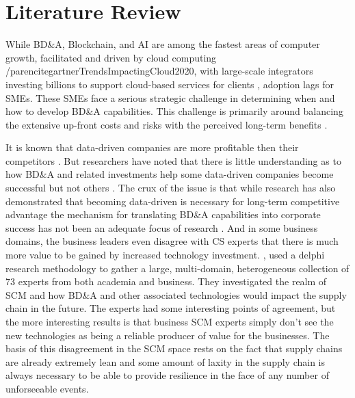 \section{Literature Review}

While BD\&A, Blockchain, and AI are among the fastest areas of computer growth, facilitated and driven by cloud computing /parencite{gartnerTrendsImpactingCloud2020}, with large-scale integrators investing billions to support cloud-based services for clients \parencite{accentureAccentureCloudFirst2020,taliaCloudsScalableBig2013}, adoption lags for SMEs. These SMEs face a serious strategic challenge in determining when and how to develop BD\&A capabilities. This challenge is primarily around balancing the extensive up-front costs and risks with the perceived long-term benefits \parencite{ajimokoConsiderationsAdoptionCloud2018}.

It is known that data-driven companies are more profitable then their competitors \parencite{alsghaierImportanceBigData2017}. But researchers have noted that there is little understanding as to how BD\&A and related investments help some data-driven companies become successful but not others \parencite{morenoBusinessIntelligenceAnalytics2020}. The crux of the issue is that while research has also demonstrated that becoming data-driven is necessary for long-term competitive advantage \parencite{alsghaierImportanceBigData2017} the mechanism for translating BD\&A capabilities into corporate success has not been an adequate focus of research \parencite{trieuGettingValueBusiness2017}. And in some business domains, the business leaders even disagree with CS experts that there is much more value to be gained by increased technology investment. \textcite{rossmannFutureSocialImpact2018}, used a delphi research methodology to gather a large, multi-domain, heterogeneous collection of 73 experts from both academia and business. They investigated the realm of SCM and how BD\&A and other associated technologies would impact the supply chain in the future. The experts had some interesting points of agreement, but the more interesting results is that business SCM experts simply don't see the new technologies as being a reliable producer of value for the businesses. The basis of this disagreement in the SCM space rests on the fact that supply chains are already extremely lean and some amount of laxity in the supply chain is always necessary to be able to provide resilience in the face of any number of unforseeable events.


